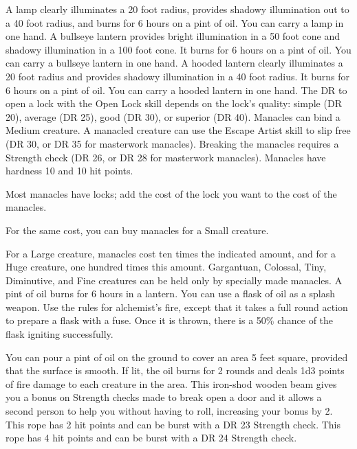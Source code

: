          A lamp clearly illuminates a 20 foot radius, provides shadowy illumination out to a 40 foot radius, and burns for 6 hours on a pint of oil. You can carry a lamp in one hand.
         A bullseye lantern provides bright illumination in a 50 foot cone and shadowy illumination in a 100 foot cone. It burns for 6 hours on a pint of oil. You can carry a bullseye lantern in one hand.
         A hooded lantern clearly illuminates a 20 foot radius and provides shadowy illumination in a 40 foot radius. It burns for 6 hours on a pint of oil. You can carry a hooded lantern in one hand.
         The DR to open a lock with the Open Lock skill depends on the lock's quality: simple (DR 20), average (DR 25), good (DR 30), or superior (DR 40).
         Manacles can bind a Medium creature. A manacled creature can use the Escape Artist skill to slip free (DR 30, or DR 35 for masterwork manacles). Breaking the manacles requires a Strength check (DR 26, or DR 28 for masterwork manacles). Manacles have hardness 10 and 10 hit points.
        \par Most manacles have locks; add the cost of the lock you want to the cost of the manacles.
        \par For the same cost, you can buy manacles for a Small creature.
        \par For a Large creature, manacles cost ten times the indicated amount, and for a Huge creature, one hundred times this amount. Gargantuan, Colossal, Tiny, Diminutive, and Fine creatures can be held only by specially made manacles.
         A pint of oil burns for 6 hours in a lantern. You can use a flask of oil as a splash weapon. Use the rules for alchemist's fire, except that it takes a full round action to prepare a flask with a fuse. Once it is thrown, there is a 50\% chance of the flask igniting successfully.
        \par You can pour a pint of oil on the ground to cover an area 5 feet square, provided that the surface is smooth. If lit, the oil burns for 2 rounds and deals 1d3 points of fire damage to each creature in the area.
         This iron-shod wooden beam gives you a  bonus on Strength checks made to break open a door and it allows a second person to help you without having to roll, increasing your bonus by 2.
         This rope has 2 hit points and can be burst with a DR 23 Strength check.
         This rope has 4 hit points and can be burst with a DR 24 Strength check.
